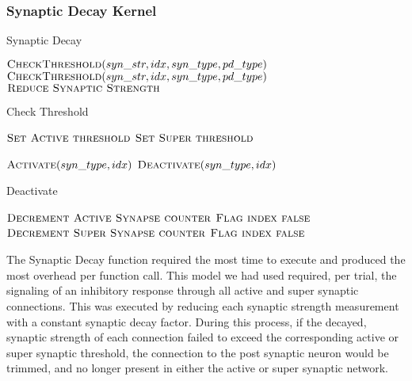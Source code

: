\documentclass[a4paper]{article}
\begin{document}

\subsubsection{Synaptic Decay Kernel}

\begin{algorithm}[H]
\caption{Synaptic Decay}
\label{alg:decay}
\begin{algorithmic}
	\State $\textsc{CheckThreshold}(syn\_str, idx, syn\_type, pd\_type)$
	\State $\textsc{CheckThreshold}(syn\_str, idx, syn\_type, pd\_type)$
	\State $\textsc{Reduce Synaptic Strength}$
\EndFor
\end{algorithmic}
\end{algorithm}

\begin{algorithm}[H]
\caption{Check Threshold}
\label{alg:check}
\begin{algorithmic}
	\State $\textsc{Set Active threshold}$
	\State $\textsc{Set Super threshold}$
\EndIf

	\State $\textsc{Activate}(syn\_type, idx)$
	\State $\textsc{Deactivate}(syn\_type, idx)$
\EndIf
\end{algorithmic}
\end{algorithm}

\begin{algorithm}[H]
\caption{Deactivate}
\label{alg:deactivate}
\begin{algorithmic}
	\State $\textsc{Decrement Active Synapse counter}$
	\State $\textsc{Flag index false}$
	\State $\textsc{Decrement Super Synapse counter}$
	\State $\textsc{Flag index false}$
\EndIf
\end{algorithmic}
\end{algorithm}

The Synaptic Decay function required the most time to execute and produced the most overhead per function call. This model we had used required, per trial, the signaling of an inhibitory response through all active and super synaptic connections. This was executed by reducing each synaptic strength measurement with a constant synaptic decay factor. During this process, if the decayed, synaptic strength of each connection failed to exceed the corresponding active or super synaptic threshold, the connection to the post synaptic neuron would be trimmed, and no longer present in either the active or super synaptic network.
\end{document}
